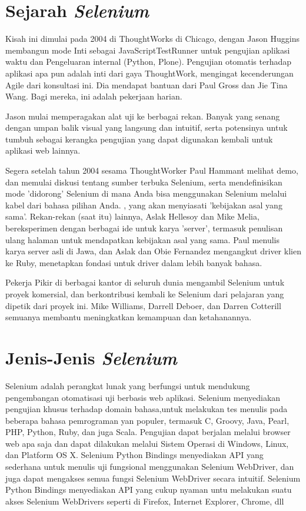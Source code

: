 \section{Sejarah \textit{Selenium}}
Kisah ini dimulai pada 2004 di ThoughtWorks di Chicago, dengan Jason Huggins membangun mode Inti sebagai JavaScriptTestRunner untuk pengujian aplikasi waktu dan Pengeluaran internal (Python, Plone). Pengujian otomatis terhadap aplikasi apa pun adalah inti dari gaya ThoughtWork, mengingat kecenderungan Agile dari konsultasi ini. Dia mendapat bantuan dari Paul Gross dan Jie Tina Wang. Bagi mereka, ini adalah pekerjaan harian.

Jason mulai memperagakan alat uji ke berbagai rekan. Banyak yang senang dengan umpan balik visual yang langsung dan intuitif, serta potensinya untuk tumbuh sebagai kerangka pengujian yang dapat digunakan kembali untuk aplikasi web lainnya.

Segera setelah tahun 2004 sesama ThoughtWorker Paul Hammant melihat demo, dan memulai diskusi tentang sumber terbuka Selenium, serta mendefinisikan mode 'didorong' Selenium di mana Anda bisa menggunakan Selenium melalui kabel dari bahasa pilihan Anda. , yang akan menyiasati 'kebijakan asal yang sama'. Rekan-rekan (saat itu) lainnya, Aslak Hellesoy dan Mike Melia, bereksperimen dengan berbagai ide untuk karya 'server', termasuk penulisan ulang halaman untuk mendapatkan kebijakan asal yang sama. Paul menulis karya server asli di Jawa, dan Aslak dan Obie Fernandez mengangkut driver klien ke Ruby, menetapkan fondasi untuk driver dalam lebih banyak bahasa.

Pekerja Pikir di berbagai kantor di seluruh dunia mengambil Selenium untuk proyek komersial, dan berkontribusi kembali ke Selenium dari pelajaran yang dipetik dari proyek ini. Mike Williams, Darrell Deboer, dan Darren Cotterill semuanya membantu meningkatkan kemampuan dan ketahanannya.

\section{Jenis-Jenis \textit{Selenium}}
Selenium adalah perangkat lunak yang berfungsi untuk mendukung pengembangan otomatisasi uji berbasis web aplikasi. Selenium menyediakan pengujian khusus terhadap domain bahasa,untuk melakukan tes menulis pada beberapa bahasa pemrograman yan populer, termasuk C, Groovy, Java, Pearl, PHP, Python, Ruby, dan juga Scala. Pengujian dapat berjalan melalui browser web apa saja dan dapat dilakukan melalui Sistem Operasi di Windows, Linux, dan Platform OS X. Selenium Python Bindings menyediakan API yang sederhana untuk menulis uji fungsional menggunakan Selenium WebDriver, dan juga dapat mengakses semua fungsi Selenium WebDriver secara intuitif. Selenium Python Bindings menyediakan API yang cukup nyaman untu melakukan suatu akses Selenium WebDrivers seperti di Firefox, Internet Explorer, Chrome, dll 

